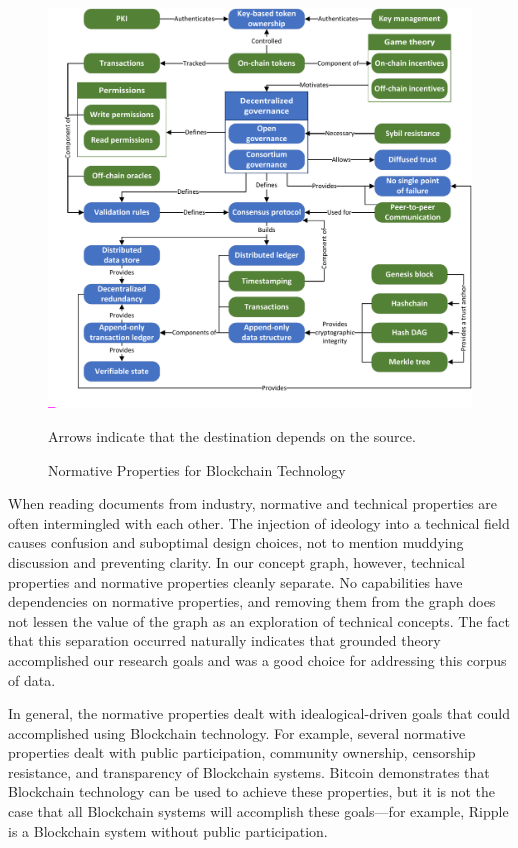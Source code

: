 \begin{figure}
	\centering
	\includegraphics[page=3,width=\columnwidth]{figures/grounded-theory-main}
	
	Arrows indicate that the destination depends on the source.
	\caption{Normative Properties for Blockchain Technology}
	\label{fig:normative-properties}
\end{figure}


When reading documents from industry, normative and technical properties are often intermingled with each other.
The injection of ideology into a technical field causes confusion and suboptimal design choices, not to mention muddying discussion and preventing clarity.
In our concept graph, however, technical properties and normative properties cleanly separate.
No capabilities have dependencies on normative properties, and removing them from the graph does not lessen the value of the graph as an exploration of technical concepts.
The fact that this separation occurred naturally indicates that grounded theory accomplished our research goals and was a good choice for addressing this corpus of data.

In general, the normative properties dealt with idealogical-driven goals that could accomplished using Blockchain technology.
For example, several normative properties dealt with public participation, community ownership, censorship resistance, and transparency of Blockchain systems.
Bitcoin demonstrates that Blockchain technology can be used to achieve these properties, but it is not the case that all Blockchain systems will accomplish these goals---for example, Ripple is a Blockchain system without public participation.


